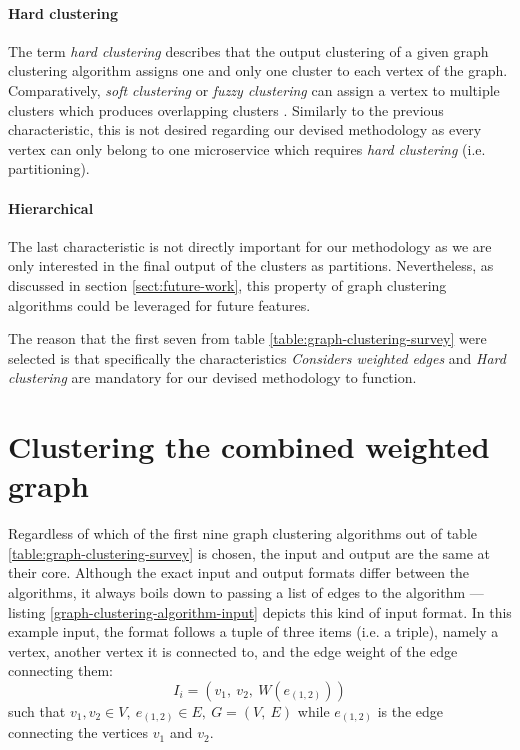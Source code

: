 \documentclass[12pt,a4paper]{report}
\begin{document}
\paragraph{Hard clustering}
The term \textit{hard clustering} describes that the output clustering
of a given graph clustering algorithm assigns one and only one cluster
to each vertex of the graph. Comparatively, \textit{soft clustering} or
\textit{fuzzy clustering} can assign a vertex to multiple clusters which
produces overlapping clusters \cite{lancichinetti2009community}.
Similarly to the previous characteristic, this is not desired regarding our
devised methodology as every vertex can only belong to one microservice
which requires \textit{hard clustering} (i.e. partitioning).

\paragraph{Hierarchical}
The last characteristic is not directly important for our methodology
as we are only interested in the final output of the clusters as partitions.
Nevertheless, as discussed in section \ref{sect:future-work},
this property of graph clustering algorithms could be leveraged for future features.
\newline

The reason that the first seven from table \ref{table:graph-clustering-survey}
were selected is that specifically the characteristics
\textit{Considers weighted edges} and \textit{Hard clustering} are mandatory
for our devised methodology to function.



\section{Clustering the combined weighted graph}

Regardless of which of the first nine graph clustering algorithms out of
table \ref{table:graph-clustering-survey} is chosen, the input and output
are the same at their core.
Although the exact input and output formats differ between the algorithms,
it always boils down to passing a list of edges to the algorithm ---
listing \ref{graph-clustering-algorithm-input} depicts this kind of input format.
In this example input, the format follows a tuple of three items (i.e. a triple),
namely a vertex, another vertex it is connected to, and the edge weight of the
edge connecting them:
\[
  I_i = (v_1, \ v_2, \ W(e_{(1,2)}))
\]
such that \(v_1, v_2 \in V, \ e_{(1,2)} \in E, \ G = (V, \ E)\) while
\(e_{(1,2)}\) is the edge connecting the vertices \(v_1\) and \(v_2\).
\end{document}
